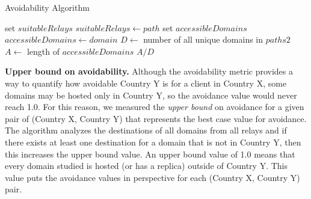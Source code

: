 \begin{algorithm}[t]
\caption{Avoidability Algorithm}
\label{avoid_algo}
\footnotesize
\begin{algorithmic}[1]
    \State set $suitableRelays$
		\State $suitableRelays \gets path$
	\EndIf
    \EndFor
    \State set $accessibleDomains$
        \State $accessibleDomains \gets domain$
        \EndIf
    \EndIf
    \EndFor
    \State $D \gets$ number of all unique domains in $paths2$
    \State $A \gets$ length of $accessibleDomains$
    \State \Return $A / D$
\EndFunction
\end{algorithmic}
\end{algorithm}


\textbf{Upper bound on avoidability.}  Although the avoidability
metric provides a way to quantify how avoidable Country
Y is for a client in Country X, some
domains may be hosted only in Country Y, so the avoidance value 
would never reach 1.0.  For this reason, we measured the {\em upper
bound} on avoidance for a given pair of (Country X, Country Y) that
represents the best case value for avoidance.  The algorithm analyzes the destinations of all domains from all relays and if there exists at least one destination for a domain that is not in Country Y, then this increases the upper bound value.  An upper bound value of 1.0 means that every domain studied is hosted (or has a replica) outside of Country Y.  This value puts the avoidance values in perspective for each (Country X, Country Y) pair. 


